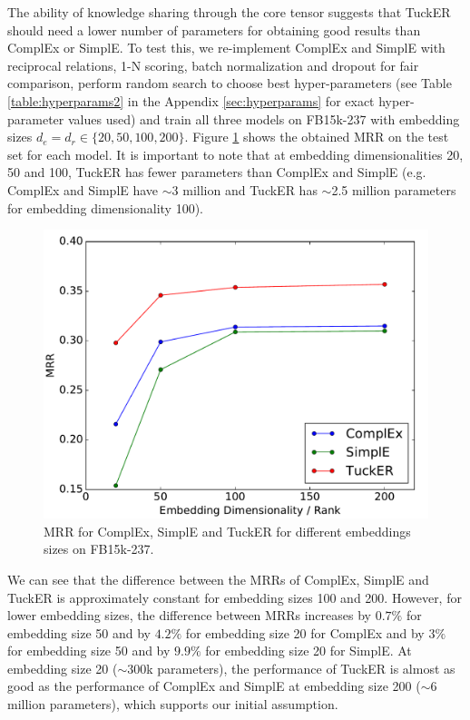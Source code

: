 \documentclass[11pt,a4paper]{article}
\begin{document}
The ability of knowledge sharing through the core tensor suggests that TuckER should need a lower number of parameters for obtaining good results than ComplEx or SimplE. To test this, we re-implement ComplEx and SimplE with reciprocal relations, 1-N scoring, batch normalization and dropout for fair comparison, perform random search to choose best hyper-parameters (see Table \ref{table:hyperparams2} in the Appendix \ref{sec:hyperparams} for exact hyper-parameter values used) and train all three models on FB15k-237 with embedding sizes $d_e = d_r \in\{20, 50, 100, 200\}$. Figure \ref{fig:results} shows the obtained MRR on the test set for each model. It is important to note that at embedding dimensionalities 20, 50 and 100, TuckER has fewer parameters than ComplEx and SimplE (e.g. ComplEx and SimplE have $\sim$3 million and TuckER has $\sim$2.5 million parameters for embedding dimensionality 100).

\begin{figure}[!htb]
\centering
\includegraphics[width=0.75\linewidth]{embedding_dim.pdf}
\caption{MRR for ComplEx, SimplE and TuckER for different embeddings sizes on FB15k-237.}
\label{fig:results}
\end{figure}

 We can see that the difference between the MRRs of ComplEx, SimplE and TuckER is approximately constant for embedding sizes 100 and 200. However, for lower embedding sizes, the difference between MRRs increases by $0.7\%$ for embedding size 50 and by $4.2\%$ for embedding size 20 for ComplEx and by $3\%$ for embedding size 50 and by $9.9\%$ for embedding size 20 for SimplE. At embedding size 20 ($\sim$300k parameters), the performance of TuckER is almost as good as the performance of ComplEx and SimplE at embedding size 200 ($\sim$6 million parameters), which supports our initial assumption.
\end{document}
